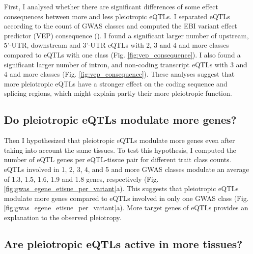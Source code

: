 First, I analysed whether there are significant differences of some effect consequences between more and less pleiotropic eQTLs.
%
I separated eQTLs according to the count of GWAS classes and computed the EBI variant effect predictor (VEP) consequence (\citep{2016.Cunningham.McLaren}).
%
I found a significant larger number of upstream, 5'-UTR, downstream and 3'-UTR eQTLs
with 2, 3 and 4 and more classes compared to eQTLs with one class (Fig. \ref{fig:vep_consequence}).
%
I also found a significant larger number of intron, and non-coding transcript eQTLs
with 3 and 4 and more classes (Fig. \ref{fig:vep_consequence}).
%
These analyses suggest that more pleiotropic eQTLs have a stronger effect on
the coding sequence and splicing regions, which might explain partly their more pleiotropic function.

%
\subsection*{Do pleiotropic eQTLs modulate more genes?}
%

Then I hypothesized that pleiotropic eQTLs modulate more genes even after taking into account the same tissues.
%
To test this hypothesis, I computed the number of eQTL genes per eQTL-tissue pair for different trait class counts.
%
%
eQTLs involved in 1, 2, 3, 4, and 5 and more GWAS classes modulate an average of 1.3, 1.5, 1.6, 1.9 and 1.8 genes, respectively (Fig. \ref{fig:gwas_egene_etisue_per_variant}a).
%
This suggests that pleiotropic eQTLs modulate more genes compared to eQTLs involved in only one GWAS class (Fig. \ref{fig:gwas_egene_etisue_per_variant}a).
%
More target genes of eQTLs provides an explanation to the observed pleiotropy.

%
\subsection*{Are pleiotropic eQTLs active in more tissues?}
%

